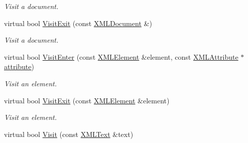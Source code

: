 \begin{DoxyCompactItemize}
\begin{DoxyCompactList}\small\item\em Visit a document. \end{DoxyCompactList}\item 
\hypertarget{classtinyxml2_1_1_x_m_l_printer_a15fc1f2b922f540917dcf52808737b29}{}virtual bool \hyperlink{classtinyxml2_1_1_x_m_l_printer_a15fc1f2b922f540917dcf52808737b29}{Visit\+Exit} (const \hyperlink{classtinyxml2_1_1_x_m_l_document}{X\+M\+L\+Document} \&)\label{classtinyxml2_1_1_x_m_l_printer_a15fc1f2b922f540917dcf52808737b29}

\begin{DoxyCompactList}\small\item\em Visit a document. \end{DoxyCompactList}\item 
\hypertarget{classtinyxml2_1_1_x_m_l_printer_a2ce2aa508c21ac91615093ddb9c282c5}{}virtual bool \hyperlink{classtinyxml2_1_1_x_m_l_printer_a2ce2aa508c21ac91615093ddb9c282c5}{Visit\+Enter} (const \hyperlink{classtinyxml2_1_1_x_m_l_element}{X\+M\+L\+Element} \&element, const \hyperlink{classtinyxml2_1_1_x_m_l_attribute}{X\+M\+L\+Attribute} $\ast$\hyperlink{_xml_write_8hpp_a4a687c3f177b66efa50586999b8a3172}{attribute})\label{classtinyxml2_1_1_x_m_l_printer_a2ce2aa508c21ac91615093ddb9c282c5}

\begin{DoxyCompactList}\small\item\em Visit an element. \end{DoxyCompactList}\item 
\hypertarget{classtinyxml2_1_1_x_m_l_printer_ae99e0a7086543591edfb565f24689098}{}virtual bool \hyperlink{classtinyxml2_1_1_x_m_l_printer_ae99e0a7086543591edfb565f24689098}{Visit\+Exit} (const \hyperlink{classtinyxml2_1_1_x_m_l_element}{X\+M\+L\+Element} \&element)\label{classtinyxml2_1_1_x_m_l_printer_ae99e0a7086543591edfb565f24689098}

\begin{DoxyCompactList}\small\item\em Visit an element. \end{DoxyCompactList}\item 
\hypertarget{classtinyxml2_1_1_x_m_l_printer_a275ae25544a12199ae40b6994ca6e4de}{}virtual bool \hyperlink{classtinyxml2_1_1_x_m_l_printer_a275ae25544a12199ae40b6994ca6e4de}{Visit} (const \hyperlink{classtinyxml2_1_1_x_m_l_text}{X\+M\+L\+Text} \&text)\label{classtinyxml2_1_1_x_m_l_printer_a275ae25544a12199ae40b6994ca6e4de}


\end{DoxyCompactItemize}
